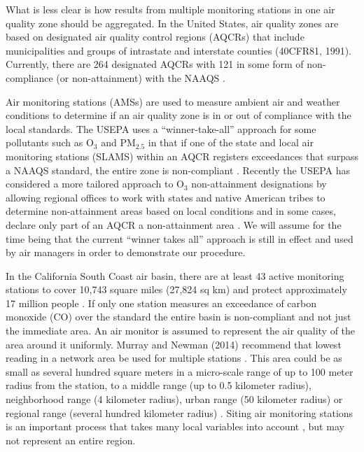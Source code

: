 What is less clear is how results from multiple monitoring stations in one air quality zone should be aggregated. In the United States, air quality zones are based on designated air quality control regions (AQCRs) that include municipalities and groups of intrastate and interstate counties (40CFR81, 1991). Currently, there are 264 designated AQCRs with 121 in some form of non-compliance (or non-attainment) with the NAAQS \citep{USEPA2016a}. 

Air monitoring stations (AMSs) are used to measure ambient air and weather conditions to determine if an air quality zone is in or out of compliance with the local standards. The USEPA uses a ``winner-take-all” approach for some pollutants such as O$_{3}$ and PM$_{2.5}$ in that if one of the state and local air monitoring stations (SLAMS) within an AQCR registers exceedances that surpass a NAAQS standard, the entire zone is non-compliant \citep{USEPA2005a}.  Recently the USEPA has considered a more tailored approach to O$_{3}$ non-attainment designations by allowing regional offices to work with states and native American tribes to determine non-attainment areas based on local conditions and in some cases, declare only part of an AQCR a non-attainment area \citep{McCabe2015}. We will assume for the time being that the current ``winner takes all” approach is still in effect and used by air managers in order to demonstrate our procedure.

In the California South Coast air basin, there are at least 43 active monitoring stations \citep{CARB2013} to cover 10,743 square miles (27,824 sq km) and protect approximately 17 million people \citep{AQMD2010}.  If only one station measures an exceedance of carbon monoxide (CO) over the standard the entire basin is non-compliant and not just the immediate area.  An air monitor is assumed to represent the air quality of the area around it uniformly.  Murray and Newman (2014) recommend that lowest reading in a network area be used for multiple stations \citep{Murray2014}. This area could be as small as several hundred square meters in a micro-scale range of up to 100 meter radius from the station, to a middle range (up to 0.5 kilometer radius), neighborhood range (4 kilometer radius), urban range (50 kilometer radius) or regional range (several hundred kilometer radius) \citep{Pan2009}.  Siting air monitoring stations is an important process that takes many local variables into account \citep{Bermudez2010}, but may not represent an entire region.

